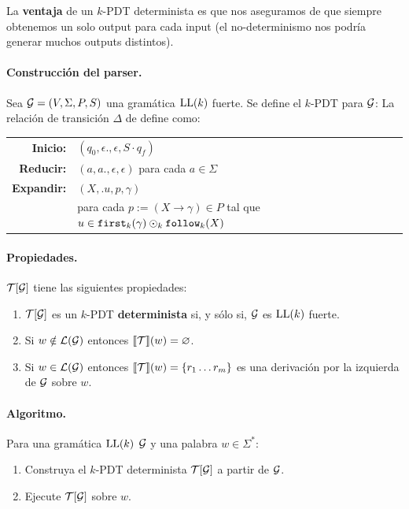 La \textbf{ventaja} de un $k$-PDT determinista es que nos aseguramos de que siempre obtenemos un solo output para cada input (el no-determinismo nos podría generar muchos outputs distintos).

\paragraph{Construcción del parser.} Sea $\mathcal{G}=(V,\Sigma, P, S)$ una gramática $\text{LL}(k)$ fuerte. Se define el $k$-PDT para $\mathcal{G}$:
La relación de transición $\Delta$ de define como:
\begin{table}[H]
    \centering
    \begin{tabular}{rl}
        \textbf{Inicio:}   & $(q_0, \epsilon., \epsilon, S\cdot q_f)$                                                \\
        \textbf{Reducir:}  & $(a, a., \epsilon, \epsilon)$ para cada $a \in \Sigma$                                  \\
        \textbf{Expandir:} & $(X, .u, p, \gamma)$                                                                    \\
                           & para cada $p:=(X\to\gamma) \in P$ tal que $u \in \texttt{first}_k(\gamma) \odot_k \texttt{follow}_k(X)$
    \end{tabular}
\end{table}

\paragraph{Propiedades.} $\mathcal{T}[\mathcal{G}]$ tiene las siguientes propiedades:
\begin{enumerate}
    \item $\mathcal{T}[\mathcal{G}]$ es un $k$-PDT \textbf{determinista} si, y sólo si, $\mathcal{G}$ es $\text{LL}(k)$ fuerte.
    \item Si $w \notin \mathcal{L}(\mathcal{G})$ entonces $\llbracket \mathcal{T} \rrbracket (w) = \varnothing$.
    \item Si $w \in \mathcal{L}(\mathcal{G})$ entonces $\llbracket \mathcal{T} \rrbracket(w) = \{r_1 \ldots r_m\}$ es una derivación por la izquierda de $\mathcal{G}$ sobre $w$.
\end{enumerate}

\paragraph{Algoritmo.} Para una gramática $\text{LL}(k)$ $\mathcal{G}$ y una palabra $w \in \Sigma^*$:
\begin{enumerate}
    \item Construya el $k$-PDT determinista $\mathcal{T}[\mathcal{G}]$ a partir de $\mathcal{G}$.
    \item Ejecute $\mathcal{T}[\mathcal{G}]$ sobre $w$.
\end{enumerate}

